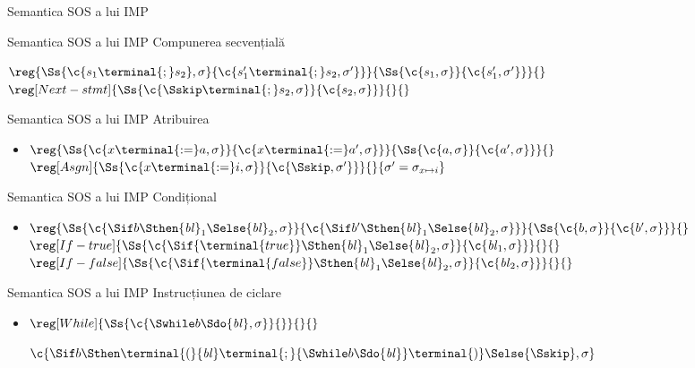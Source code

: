 \documentclass[xcolor=pdftex,romanian,colorlinks]{beamer}
\begin{document}
\begin{section}{Semantica SOS a lui IMP}
  \begin{frame}{Semantica SOS a lui IMP}
  {Compunerea secvențială}
  \begin{itemize}
  \vitem[] $\reg{\Ss{\c{s_1 \terminal{;} s_2},\sigma}{\c{s_1' \terminal{;} s_2,\sigma'}}}{\Ss{\c{s_1,\sigma}}{\c{s_1',\sigma'}}}{}$
  \vitem[] $\reg[Next-stmt]{\Ss{\c{\Sskip \terminal{;} s_2,\sigma}}{\c{s_2,\sigma}}}{}{}$
  \end{itemize}
  \end{frame}

  \begin{frame}{Semantica SOS a lui IMP}
  {Atribuirea}
  \begin{itemize}
  \item[] $\reg{\Ss{\c{x \terminal{:=} a ,\sigma}}{\c{x \terminal{:=} a' ,\sigma}}}{\Ss{\c{a,\sigma}}{\c{a',\sigma}}}{}$
  \vitem[] $\reg[Asgn]{\Ss{\c{x \terminal{:=} i ,\sigma}}{\c{\Sskip,\sigma'}}}{}{\sigma'=\sigma_{x \mapsto i}}$
  \end{itemize}
  \end{frame}

  \begin{frame}{Semantica SOS a lui IMP}
  {Condițional}
  \begin{itemize}
  \item[]
  $\reg{
   \Ss{\c{\Sif b \Sthen {\it bl}_1 \Selse {\it bl}_2,\sigma}}{\c{\Sif b' \Sthen {\it bl}_1 \Selse {\it bl}_2,\sigma}}
  }{
    \Ss{\c{b,\sigma}}{\c{b',\sigma}}
  }
  {}$
  \vitem[]
  $\reg[If-true]{\Ss{\c{\Sif {\terminal{true}} \Sthen {\it bl}_1 \Selse {\it bl}_2,\sigma}}{\c{{\it bl}_1,\sigma}}}{}{}$
  \vitem[]
  $\reg[If-false]{\Ss{\c{\Sif {\terminal{false}} \Sthen {\it bl}_1 \Selse {\it bl}_2,\sigma}}{\c{{\it bl}_2,\sigma}}}{}{}$

  \end{itemize}
  \end{frame}

  \begin{frame}{Semantica SOS a lui IMP}
  {Instrucțiunea de ciclare}
  \begin{itemize}
  \item[]
  $\reg[While]{
   \Ss{\c{\Swhile b \Sdo {\it bl},\sigma}}{}}{}{}
  $

  \hfill $\c{\Sif b\Sthen \terminal{(} {\it bl}\terminal{;} {\Swhile b\Sdo {\it bl}} \terminal{)} \Selse {\Sskip},\sigma}$
  \end{itemize}
  \end{frame}



\end{section}
\end{document}
